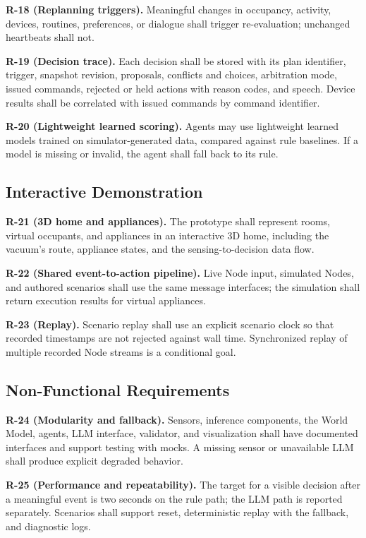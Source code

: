 \documentclass[conference]{IEEEtran}
\begin{document}
\textbf{R-18 (Replanning triggers).}
Meaningful changes in occupancy, activity, devices, routines,
preferences, or dialogue shall trigger re-evaluation; unchanged
heartbeats shall not.

\textbf{R-19 (Decision trace).}
Each decision shall be stored with its plan identifier, trigger,
snapshot revision, proposals, conflicts and choices, arbitration
mode, issued commands, rejected or held actions with reason codes,
and speech. Device results shall be correlated with issued commands
by command identifier.

\textbf{R-20 (Lightweight learned scoring).}
Agents may use lightweight learned models trained on
simulator-generated data, compared against rule baselines. If a
model is missing or invalid, the agent shall fall back to its rule.

\subsection{Interactive Demonstration}

\textbf{R-21 (3D home and appliances).}
The prototype shall represent rooms, virtual occupants, and
appliances in an interactive 3D home, including the vacuum's route,
appliance states, and the sensing-to-decision data flow.

\textbf{R-22 (Shared event-to-action pipeline).}
Live Node input, simulated Nodes, and authored scenarios shall use
the same message interfaces; the simulation shall return execution
results for virtual appliances.

\textbf{R-23 (Replay).}
Scenario replay shall use an explicit scenario clock so that
recorded timestamps are not rejected against wall time.
Synchronized replay of multiple recorded Node streams is a
conditional goal.

\subsection{Non-Functional Requirements}

\textbf{R-24 (Modularity and fallback).}
Sensors, inference components, the World Model, agents, LLM
interface, validator, and visualization shall have documented
interfaces and support testing with mocks. A missing sensor or
unavailable LLM shall produce explicit degraded behavior.

\textbf{R-25 (Performance and repeatability).}
The target for a visible decision after a meaningful event is two
seconds on the rule path; the LLM path is reported separately.
Scenarios shall support reset, deterministic replay with the
fallback, and diagnostic logs.
\end{document}
